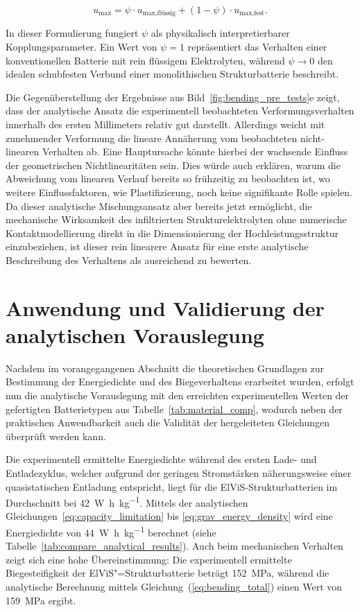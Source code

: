 \begin{equation}
    \label{eq:bending_total}
    u_{\text{max}} = \psi \cdot u_{\text{max,flüssig}} + (1-\psi) \cdot u_{\text{max,fest}}.
\end{equation}

In dieser Formulierung fungiert $\psi$ als physikalisch interpretierbarer Kopplungsparameter. Ein Wert von $\psi = 1$ repräsentiert das Verhalten einer konventionellen Batterie mit rein flüssigem Elektrolyten, während $\psi \to 0$ den idealen schubfesten Verbund einer monolithischen Strukturbatterie beschreibt.

Die Gegenüberstellung der Ergebnisse aus Bild~\ref{fig:bending_pre_tests}e zeigt, dass der analytische Ansatz die experimentell beobachteten Verformungsverhalten innerhalb des ersten Millimeters relativ gut darstellt. Allerdings weicht mit zunehmender Verformung die lineare Annäherung vom beobachteten nicht-linearen Verhalten ab. Eine Hauptursache könnte hierbei der wachsende Einfluss der geometrischen Nichtlinearitäten sein. Dies würde auch erklären, warum die Abweichung vom linearen Verlauf bereits so frühzeitig zu beobachten ist, wo weitere Einflussfaktoren, wie Plastifizierung, noch keine signifikante Rolle spielen. Da dieser analytische Mischungsansatz aber bereits jetzt ermöglicht, die mechanische Wirksamkeit des infiltrierten Strukturelektrolyten ohne numerische Kontaktmodellierung direkt in die Dimensionierung der Hochleistungsstruktur einzubeziehen, ist dieser rein linearere Ansatz für eine erste analytische Beschreibung des Verhaltens als ausreichend zu bewerten.

\section{Anwendung und Validierung der analytischen Vorauslegung}

Nachdem im vorangegangenen Abschnitt die theoretischen Grundlagen zur Bestimmung der Energiedichte und des Biegeverhaltens erarbeitet wurden, erfolgt nun die analytische Vorauslegung mit den erreichten experimentellen Werten der gefertigten Batterietypen aus Tabelle~\ref{tab:material_comp}, wodurch neben der praktischen Anwendbarkeit auch die Validität der hergeleiteten Gleichungen überprüft werden kann.

Die experimentell ermittelte Energiedichte während des ersten Lade- und Entladezyklus, welcher aufgrund der geringen Stromstärken näherungsweise einer quasistatischen Entladung entspricht, liegt für die ElViS-Strukturbatterien im Durchschnitt bei 42~\unit{\watt\hour\per\kilo\gram}. Mittels der analytischen Gleichungen~\ref{eq:capacity_limitation} bis \ref{eq:grav_energy_density} wird eine Energiedichte von 44~\unit{\watt\hour\per\kilo\gram} berechnet (siehe Tabelle~\ref{tab:compare_analytical_results}). Auch beim mechanischen Verhalten zeigt sich eine hohe Übereinstimmung: Die experimentell ermittelte Biegesteifigkeit der ElViS"=Strukturbatterie beträgt 152~\unit{\mega\pascal}, während die analytische Berechnung mittels Gleichung~(\ref{eq:bending_total}) einen Wert von 159~\unit{\mega\pascal} ergibt.

